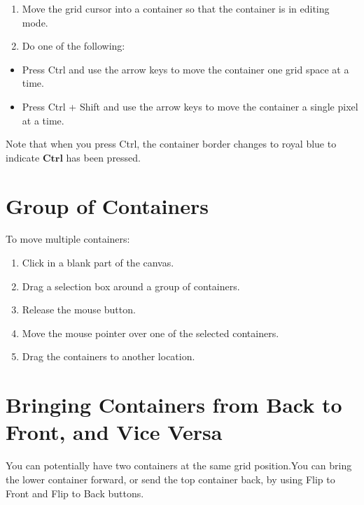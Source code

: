 \begin{enumerate}
  \item Move the grid cursor into a container so that the container is in editing mode.

  \item Do one of the following:

\end{enumerate}

\begin{itemize}
  \item Press Ctrl and use the arrow keys to move the container one grid space at a time.

  \item Press Ctrl + Shift and use the arrow keys to move the container a single pixel at a time.

\end{itemize}

Note that when you press Ctrl, the container border changes to royal blue to indicate $\mathbf{C t r l}$ has been pressed.

\section{Group of Containers}
To move multiple containers:

\begin{enumerate}
  \item Click in a blank part of the canvas.

  \item Drag a selection box around a group of containers.

  \item Release the mouse button.

  \item Move the mouse pointer over one of the selected containers.

  \item Drag the containers to another location.

\end{enumerate}

\section{Bringing Containers from Back to Front, and Vice Versa}
You can potentially have two containers at the same grid position.You can bring the lower container forward, or send the top container back, by using Flip to Front and Flip to Back buttons.

